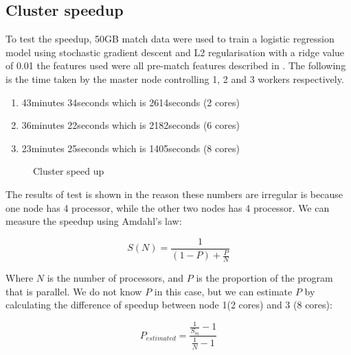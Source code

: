 \subsection{Cluster speedup}\label{sec:speedup}
To test the speedup, 50GB match data were used to train a logistic regression model using stochastic gradient descent and L2 regularisation with a ridge value of 0.01 the features used were all pre-match features described in . The following is the time taken by the master node controlling 1, 2 and 3 workers respectively.

\begin{enumerate}
    \item 43minutes 34seconds which is 2614seconds (2 cores)
    \item 36minutes 22seconds which is 2182seconds (6 cores)
    \item 23minutes 25seconds which is 1405seconds (8 cores)
\end{enumerate}

\begin{figure}[!htb]
  \centering
   \caption{Cluster speed up}\label{fig:cluster-speedup}
\end{figure}
The results of test is shown in  the reason these numbers are irregular is because one node has 4 processor, while the other two nodes has 4 processor. We can measure the speedup using Amdahl's law:

\[S(N) = \frac{1}{(1-P)+\frac{P}{N}}\]

Where $N$ is the number of processors, and $P$ is the proportion of the program that is parallel. We do not know $P$ in this case, but we can estimate $P$ by calculating the difference of speedup between node 1(2 cores) and 3 (8 cores):

\[P_{estimated} = \frac{\frac{1}{S_m}-1}{\frac{1}{N}-1}  \]

